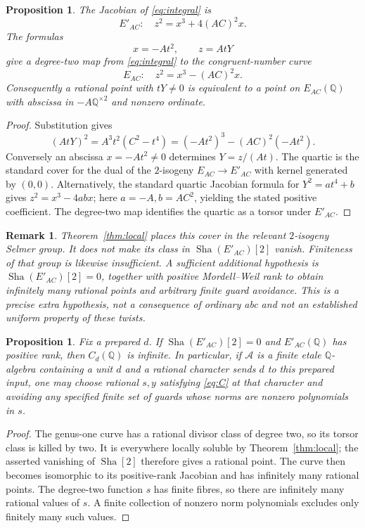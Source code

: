 \documentclass[11pt]{article}
\newtheorem{proposition}[theorem]{Proposition}
\newtheorem{remark}[theorem]{Remark}
\newcommand{\Q}{\mathbb Q}
\newcommand{\Sha}{\operatorname{Sha}}
\begin{document}
\begin{proposition}\label{prop:cover}
The Jacobian of \eqref{eq:integral} is
\[
 E'_{AC}:\quad z^2=x^3+4(AC)^2x.
\]
The formulas
\[
 x=-At^2,\qquad z=AtY
\]
give a degree-two map from \eqref{eq:integral} to the congruent-number curve
\[
 E_{AC}:\quad z^2=x^3-(AC)^2x.
\]
Consequently a rational point with $tY\ne0$ is equivalent to a point on $E_{AC}(\Q)$ with abscissa in $-A\Q^{\times2}$ and nonzero ordinate.
\end{proposition}
\begin{proof}
Substitution gives
\[
 (AtY)^2=A^3t^2(C^2-t^4)=(-At^2)^3-(AC)^2(-At^2).
\]
Conversely an abscissa $x=-At^2\ne0$ determines $Y=z/(At)$. The quartic is the standard cover for the dual of the $2$-isogeny $E_{AC}\to E'_{AC}$ with kernel generated by $(0,0)$. Alternatively, the standard quartic Jacobian formula for $Y^2=a t^4+b$ gives $z^2=x^3-4abx$; here $a=-A,b=AC^2$, yielding the stated positive coefficient. The degree-two map identifies the quartic as a torsor under $E'_{AC}$.
\end{proof}

\begin{remark}\label{rem:gap}
Theorem~\ref{thm:local} places this cover in the relevant $2$-isogeny Selmer group. It does not make its class in $\Sha(E'_{AC})[2]$ vanish. Finiteness of that group is likewise insufficient. A sufficient additional hypothesis is $\Sha(E'_{AC})[2]=0$, together with positive Mordell--Weil rank to obtain infinitely many rational points and arbitrary finite guard avoidance. This is a precise extra hypothesis, not a consequence of ordinary abc and not an established uniform property of these twists.
\end{remark}

\begin{proposition}\label{prop:conditional}
Fix a prepared $d$. If $\Sha(E'_{AC})[2]=0$ and $E'_{AC}(\Q)$ has positive rank, then $C_d(\Q)$ is infinite. In particular, if $\mathcal A$ is a finite etale $\Q$-algebra containing a unit $d$ and a rational character sends $d$ to this prepared input, one may choose rational $s,y$ satisfying \eqref{eq:C} at that character and avoiding any specified finite set of guards whose norms are nonzero polynomials in $s$.
\end{proposition}
\begin{proof}
The genus-one curve has a rational divisor class of degree two, so its torsor class is killed by two. It is everywhere locally soluble by Theorem~\ref{thm:local}; the asserted vanishing of $\Sha[2]$ therefore gives a rational point. The curve then becomes isomorphic to its positive-rank Jacobian and has infinitely many rational points. The degree-two function $s$ has finite fibres, so there are infinitely many rational values of $s$. A finite collection of nonzero norm polynomials excludes only finitely many such values.
\end{proof}
\end{document}
